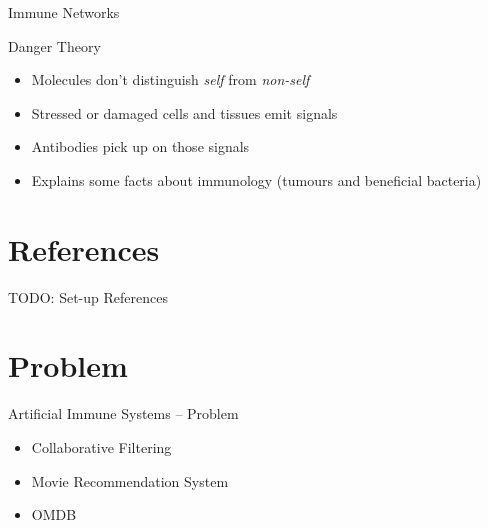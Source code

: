 \documentclass[xcolor=svgnames]{beamer}
\begin{document}
    \begin{frame}{Immune Networks}
        \SetEndCharOfAlgoLine{}
    \end{frame}
    
    \begin{frame}{Danger Theory}
		    \begin{itemize}
		        \item Molecules don't distinguish \textit{self} from \textit{non-self}
		        \item Stressed or damaged cells and tissues emit signals
		        \item Antibodies pick up on those signals
		        \item Explains some facts about immunology (tumours and beneficial bacteria)
		    \end{itemize}
		\end{frame}

         
    \section{References}
    
    \begin{frame}
    	TODO: Set-up References
    \end{frame}     
            
    \section{Problem}
    
    	\begin{frame}{Artificial Immune Systems -- Problem}
        	 
            \begin{itemize}
				\item Collaborative Filtering
                \item Movie Recommendation System
                \item OMDB
			\end{itemize}
            
       \end{frame}
\end{document}

